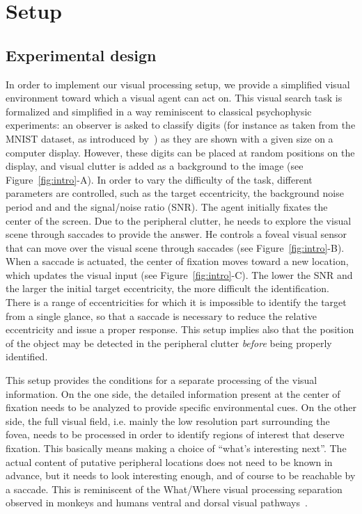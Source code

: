 \section{Setup}
\label{sec:principles}
\subsection{Experimental design}
In order to implement our visual processing setup, we provide a simplified visual environment toward which a visual agent can act on. This visual search task is formalized and simplified in a way reminiscent to classical psychophysic experiments: an observer is asked to classify digits (for instance as taken from the MNIST dataset, as introduced by~\cite{Lecun1998}) as they are shown with a given size on a computer display. However, these digits can be placed at random positions on the display, and visual clutter is added as a background to the image (see Figure~\ref{fig:intro}-A). In order to vary the difficulty of the task, different parameters are controlled, such as the target eccentricity, the background noise period and and the signal/noise ratio (SNR).
The agent initially fixates the center of the screen. Due to the peripheral clutter, he needs to explore the visual scene through saccades to provide the answer. He controls a foveal visual sensor that can move over the visual scene through saccades (see Figure~\ref{fig:intro}-B). When a saccade is actuated, the center of fixation moves toward a new location, which updates the visual input (see Figure~\ref{fig:intro}-C).
The lower the SNR and the larger the initial target eccentricity, the more difficult the identification. There is a range of eccentricities for which it is impossible to identify the target from a single glance, so that a saccade is necessary to reduce the relative eccentricity and issue a proper response. This setup implies also that the position of the object may be detected in the peripheral clutter \emph{before} being properly identified.

This setup provides the conditions for a separate processing of the visual information. On the one side, the detailed information present at the center of fixation needs to be analyzed to provide specific environmental cues. On the other side, the full visual field, i.e. mainly the low resolution part surrounding the fovea, needs to be processed in order to identify regions of interest that deserve fixation. This basically means making a choice of “what’s interesting next”. The actual content of putative peripheral locations does not need to be known in advance, but it needs to look interesting enough, and of course to be reachable by a saccade. This is reminiscent of the What/Where visual processing separation observed in monkeys and humans ventral and dorsal visual pathways~\cite{mishkin1983object}.

